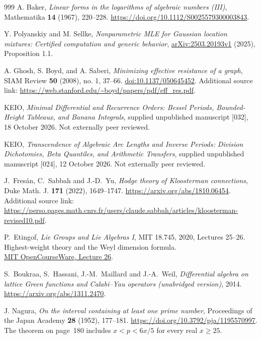 \documentclass[11pt,a4paper]{article}
\theoremstyle{definition}
\theoremstyle{remark}
\numberwithin{equation}{section}
\begin{document}
\begin{thebibliography}{999}
A. Baker,
\emph{Linear forms in the logarithms of algebraic numbers (III)},
Mathematika \textbf{14} (1967), 220--228.
\url{https://doi.org/10.1112/S0025579300003843}.

Y. Polyanskiy and M. Sellke,
\emph{Nonparametric MLE for Gaussian location mixtures: Certified
computation and generic behavior},
\href{https://arxiv.org/html/2503.20193v1}{arXiv:2503.20193v1}
(2025), Proposition 1.1.

A. Ghosh, S. Boyd, and A. Saberi,
\emph{Minimizing effective resistance of a graph},
SIAM Review \textbf{50} (2008), no. 1, 37--66.
\href{https://doi.org/10.1137/050645452}{doi:10.1137/050645452}.
Additional source link: \url{https://web.stanford.edu/~boyd/papers/pdf/eff_res.pdf}.

KEIO, \emph{Minimal Differential and Recurrence Orders: Bessel Periods,
Bounded-Height Tableaux, and Banana Integrals}, supplied unpublished
manuscript [032], 18 October 2026. Not externally peer reviewed.

KEIO, \emph{Transcendence of Algebraic Arc Lengths and Inverse Periods:
Division Dichotomies, Beta Quantiles, and Arithmetic Transfers},
supplied unpublished manuscript [024], 12 October 2026.
Not externally peer reviewed.

J.~Fres\'an, C.~Sabbah and J.-D.~Yu,
\emph{Hodge theory of Kloosterman connections},
Duke Math. J. \textbf{171} (2022), 1649--1747.
\url{https://arxiv.org/abs/1810.06454}.
Additional source link: \url{https://perso.pages.math.cnrs.fr/users/claude.sabbah/articles/kloosterman-revised10.pdf}.

P.~Etingof, \emph{Lie Groups and Lie Algebras I}, MIT 18.745,
2020, Lectures 25--26.\\
Highest-weight theory and the Weyl dimension formula.\\
\href{https://ocw.mit.edu/courses/18-745-lie-groups-and-lie-algebras-i-fall-2020/mit18_745_f20_lec26.pdf}{MIT OpenCourseWare, Lecture 26}.

S.~Boukraa, S.~Hassani, J.-M.~Maillard and J.-A.~Weil,
\emph{Differential algebra on lattice Green functions and Calabi--Yau
operators (unabridged version)}, 2014.
\url{https://arxiv.org/abs/1311.2470}.

J. Nagura,
\emph{On the interval containing at least one prime number},
Proceedings of the Japan Academy \textbf{28} (1952), 177--181.
\url{https://doi.org/10.3792/pja/1195570997}.
The theorem on page~180 includes $x<p<6x/5$ for every real $x\ge25$.


\end{thebibliography}
\end{document}
